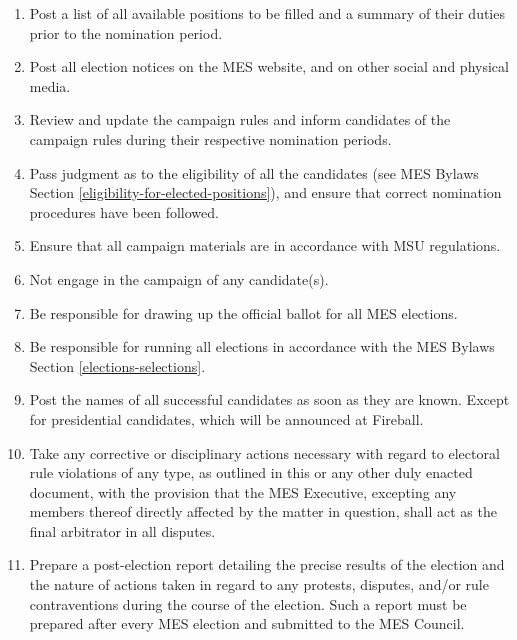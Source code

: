 \begin{enumerate}
  \begin{enumerate}
   \item
    Post a list of all available positions to be filled and a summary of their duties prior to the nomination period.
   \item
    Post all election notices on the MES website, and on other social and physical media.
   \item
    Review and update the campaign rules and inform candidates of the campaign rules during their respective nomination periods.
   \item
    Pass judgment as to the eligibility of all the candidates (see MES Bylaws Section \ref{eligibility-for-elected-positions}), and ensure that correct nomination procedures have been followed.
   \item
    Ensure that all campaign materials are in accordance with MSU regulations.
   \item
    Not engage in the campaign of any candidate(s).
   \item
    Be responsible for drawing up the official ballot for all MES elections.
   \item
    Be responsible for running all elections in accordance with the MES Bylaws Section \ref{elections-selections}.
   \item
    Post the names of all successful candidates as soon as they are known. Except for presidential candidates, which will be announced at Fireball.
   \item
    Take any corrective or disciplinary actions necessary with regard to electoral rule violations of any type, as outlined in this or any other duly enacted document, with the provision that the MES Executive, excepting any members thereof directly affected by the matter in question, shall act as the final arbitrator in all disputes.
   \item
    Prepare a post-election report detailing the precise results of the election and the nature of actions taken in regard to any protests, disputes, and/or rule contraventions during the course of the election. Such a report must be prepared after every MES election and submitted to the MES Council.
  \end{enumerate}
\end{enumerate}

